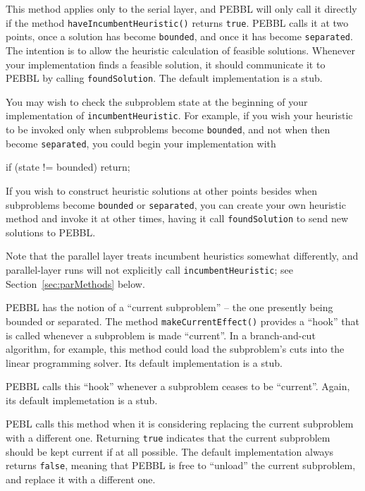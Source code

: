 This method applies only to the serial layer, and PEBBL will only call
it directly if the method \texttt{haveIncumbentHeuristic()} returns
\texttt{true}.  PEBBL calls it at two points, once a solution has
become \texttt{bounded}, and once it has become \texttt{separated}. 
The intention is to allow the heuristic calculation of feasible
solutions.  Whenever your implementation finds a feasible solution, it
should communicate it to PEBBL by calling \texttt{foundSolution}.  The
default implementation is a stub.

You may wish to check the subproblem state at the beginning of your
implementation of \texttt{incumbentHeuristic}.  For example, if you
wish your heuristic to be invoked only when subproblems become
\texttt{bounded}, and not when then become \texttt{separated}, you
could begin your implementation with
\begin{codeblock}
if (state != bounded) return;
\end{codeblock}
If you wish to construct heuristic solutions at other points besides
when subproblems become \texttt{bounded} or \texttt{separated}, you
can create your own heuristic method and invoke it at other times,
having it call \texttt{foundSolution} to send new solutions to PEBBL.

Note that the parallel layer treats incumbent heuristics somewhat
differently, and parallel-layer runs will not explicitly call
\texttt{incumbentHeuristic}; see Section~\ref{sec:parMethods} below.
 
 PEBBL has the notion of a
``current subproblem'' -- the one presently being bounded or
separated.  The method \texttt{makeCurrentEffect()} provides a
``hook'' that is called whenever a subproblem is made ``current''.  In
a branch-and-cut algorithm, for example, this method could load the
subproblem's cuts into the linear programming solver.  Its default
implementation is a stub.

PEBBL calls this ``hook'' whenever a subproblem ceases to be
``current''.  Again, its default implemetation is a stub.

PEBL calls this method when it is considering replacing the current
subproblem with a different one.  Returning \texttt{true} indicates
that the current subproblem should be kept current if at all possible.
The default implementation always returns \texttt{false}, meaning that
PEBBL is free to ``unload'' the current subproblem, and replace it
with a different one.

